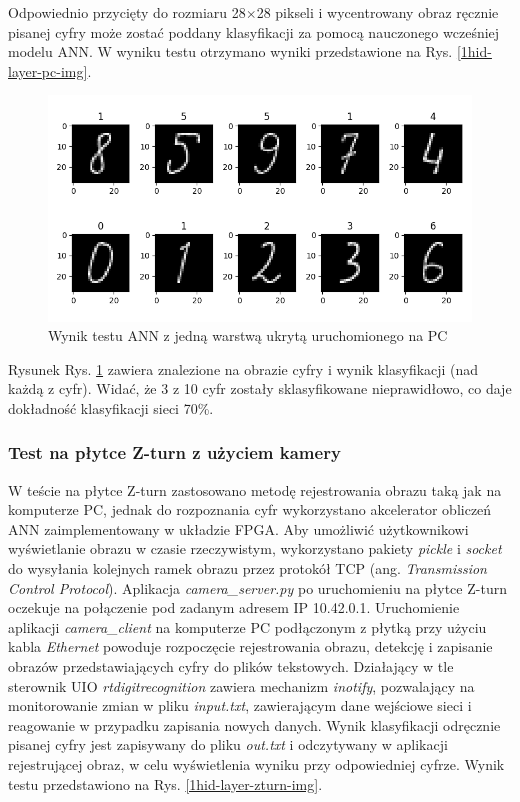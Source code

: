 Odpowiednio przycięty do rozmiaru 28$\times$28 pikseli i wycentrowany obraz ręcznie pisanej cyfry może 
zostać poddany klasyfikacji za pomocą nauczonego wcześniej modelu ANN. W wyniku testu otrzymano 
wyniki przedstawione na Rys. \ref{1hid-layer-pc-img}. 

\begin{figure}[!h]
    \centering
    \includegraphics[width=\textwidth]{img/1hid-layer-pc-plot.png}
    \caption{Wynik testu ANN z jedną warstwą ukrytą uruchomionego na PC}
    \label{1hid-layer-pc-plot}
\end{figure}


Rysunek Rys. \ref{1hid-layer-pc-plot} zawiera znalezione na obrazie cyfry i wynik klasyfikacji (nad 
każdą z cyfr). Widać, że 3 z 10 cyfr zostały sklasyfikowane nieprawidłowo, co daje dokładność 
klasyfikacji sieci 70\%.

\subsubsection{Test na płytce Z-turn z użyciem kamery}

W teście na płytce Z-turn zastosowano metodę rejestrowania obrazu taką jak na komputerze PC, jednak 
do rozpoznania cyfr wykorzystano akcelerator obliczeń ANN zaimplementowany w układzie FPGA.  
Aby umożliwić użytkownikowi wyświetlanie obrazu w czasie rzeczywistym, wykorzystano pakiety \emph{pickle} i \emph{socket} do wysyłania kolejnych ramek obrazu przez protokół TCP (ang. \emph{Transmission Control Protocol}). Aplikacja \emph{camera\_server.py} po uruchomieniu na płytce Z-turn oczekuje na połączenie pod zadanym adresem IP 10.42.0.1. Uruchomienie aplikacji \emph{camera\_client} na komputerze PC podłączonym z płytką przy użyciu kabla \emph{Ethernet} powoduje rozpoczęcie rejestrowania obrazu, detekcję i zapisanie obrazów przedstawiających cyfry do plików tekstowych. Działający w tle sterownik UIO \emph{rtdigitrecognition} zawiera mechanizm \emph{inotify}, pozwalający na monitorowanie zmian w pliku \emph{input.txt}, zawierającym dane wejściowe sieci i reagowanie w przypadku zapisania nowych danych. Wynik klasyfikacji odręcznie pisanej cyfry jest zapisywany do pliku \emph{out.txt} i odczytywany w aplikacji rejestrującej obraz, w celu wyświetlenia wyniku przy odpowiedniej cyfrze. Wynik testu przedstawiono na Rys. \ref{1hid-layer-zturn-img}.

